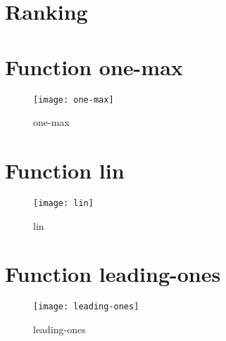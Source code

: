 \graphicspath{{../graphics/}}
\section{Ranking}
\begin{center}

\end{center}

\newpage
\section{Function one-max}
\begin{center}

\end{center}
\begin{center}

\end{center}
\begin{figure}[h]
\centering
\begin{center}
\texttt{[image: one-max]}
\caption{one-max}
\end{center}
\end{figure}
\newpage
\section{Function lin}
\begin{center}

\end{center}
\begin{center}

\end{center}
\begin{figure}[h]
\centering
\begin{center}
\texttt{[image: lin]}
\caption{lin}
\end{center}
\end{figure}
\newpage
\section{Function leading-ones}
\begin{center}

\end{center}
\begin{center}

\end{center}
\begin{figure}[h]
\centering
\begin{center}
\texttt{[image: leading-ones]}
\caption{leading-ones}
\end{center}
\end{figure}
\newpage
